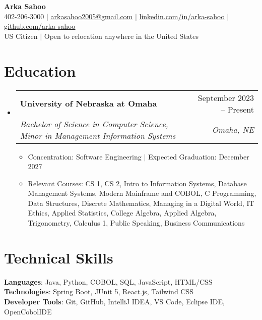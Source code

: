 \documentclass[letterpaper,11pt]{article}
\makeatletter
\newcommand{\resumeItem}[1]{
  \item\small{
    {#1 \vspace{-2pt}}
  }
}
\newcommand{\resumeSubheading}[4]{
  \vspace{-2pt}\item
    \begin{tabular*}{0.97\textwidth}[t]{l@{\extracolsep{\fill}}r}
      \textbf{#1} & #2 \\
      \textit{\small#3} & \textit{\small #4} \\
    \end{tabular*}\vspace{-7pt}
}
\newcommand{\resumeSubHeadingListStart}{\begin{itemize}[leftmargin=0.15in, label={}]}
\newcommand{\resumeSubHeadingListEnd}{\end{itemize}}
\newcommand{\resumeItemListStart}{\begin{itemize}}
\newcommand{\resumeItemListEnd}{\end{itemize}\vspace{-5pt}}
\makeatother
\begin{document}

\begin{center}
    \textbf{\Huge Arka Sahoo} \\ \vspace{1pt}
    \small 402-206-3000
    $|$
    \href{mailto:anishsahoo2005@gmail.com}{\underline{arkasahoo2005@gmail.com}}
    $|$
    \href{https://linkedin.com/in/anish-sahoo}{\underline{linkedin.com/in/arka-sahoo}} $|$
    \href{https://github.com/anish-sahoo}{\underline{github.com/arka-sahoo}} \vspace{1pt} \\
    US Citizen $|$ Open to relocation anywhere in the United States
\end{center}


\section{Education}
  \resumeSubHeadingListStart
    \resumeSubheading
      {University of Nebraska at Omaha}{September 2023 -- Present}
      {Bachelor of Science in Computer Science, Minor in Management Information Systems}{Omaha, NE}
    \resumeItemListStart
        \resumeItem{Concentration: Software Engineering $|$ Expected Graduation: December 2027}
        \resumeItem{Relevant Courses: CS 1, CS 2, Intro to Information Systems, Database Management Systems, Modern Mainframe and COBOL, C Programming, Data Structures, Discrete Mathematics, Managing in a Digital World, IT Ethics, Applied Statistics, College Algebra, Applied Algebra, Trigonometry, Calculus 1, Public Speaking, Business Communications}
    \resumeItemListEnd
  \resumeSubHeadingListEnd

\section{Technical Skills}
\begin{itemize}[leftmargin=0.15in, label={}]
  \small{\item{
   \textbf{Languages}{: Java, Python, COBOL, SQL, JavaScript, HTML/CSS} \\  
   \textbf{Technologies}{: Spring Boot, JUnit 5, React.js, Tailwind CSS} \\  
   \textbf{Developer Tools}{: Git, GitHub, IntelliJ IDEA, VS Code, Eclipse IDE, OpenCobolIDE} \\
  }}
\end{itemize}
\end{document}
